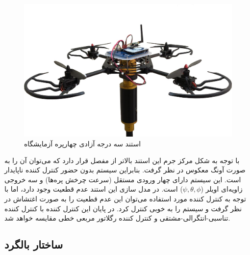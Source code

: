 \begin{figure}[H]\label{LabQuad}
	\includegraphics[width=12cm]{../../Figures/introduction/3DOFQuad.jpg}
	\centering
	\caption{استند سه درجه آزادی چهارپره آزمایشگاه 
	\cite{Iranlabexpo}}
\end{figure}
با توجه به شکل مرکز جرم این استند بالاتر از مفصل قرار دارد که می‌توان آن را به صورت آونگ معکوس در نظر گرفت. بنابراین سیستم بدون حضور کنترل کننده ناپایدار است. این سیستم دارای چهار ورودی مستقل (سرعت چرخش پره‌ها) و سه خروجی زاویه‌ای اویلر ($\psi, \theta, \phi$) است. در مدل سازی این استند عدم قطعیت وجود دارد، اما با توجه به کنترل کننده مورد استفاده می‌توان این عدم قطعیت را به صورت اغتشاش در نظر گرفت و سیستم را به خوبی کنترل کرد. در پایان این کنترل کننده با کنترل کننده تناسبی-انتگرالی-مشتقی 
و کنترل کننده رگلاتور مربعی خطی مقایسه خواهد ‌شد.


\subsection{ساختار بالگرد}

